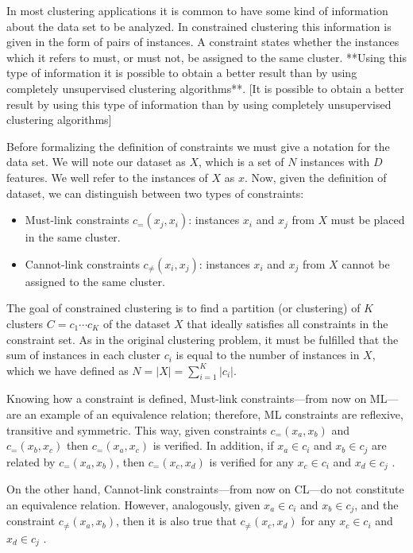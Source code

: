 \documentclass[review]{elsarticle}
\begin{document}
In most clustering applications it is common to have some kind of information about the data set to be analyzed. In constrained clustering this information is given in the form of pairs of instances. A constraint states whether the instances which it refers to must, or must not, be assigned to the same cluster. **Using this type of information it is possible to obtain a better result than by using completely unsupervised clustering algorithms**. [It is possible to obtain a better result by using this type of information than by using completely unsupervised clustering algorithms]

Before formalizing the definition of constraints we must give a notation for the data set. We will note our dataset as $X$, which is a set of $N$ instances with $D$ features. We well refer to the instances of $X$ as $x$. Now, given the definition of dataset, we can distinguish between two types of constraints:

\begin{itemize}

	\item Must-link constraints $c_=(x_j,x_i)$: instances $x_i$ and $x_j$ from $X$ must be placed in the same cluster.

	\item Cannot-link constraints $c_{\neq}(x_i,x_j)$: instances $x_i$ and $x_j$ from $X$ cannot be assigned to the same cluster.

\end{itemize}

The goal of constrained clustering is to find a partition (or clustering) of $K$ clusters $C = {c_1 \cdots c_K}$ of the dataset $X$ that ideally satisfies all constraints in the constraint set. As in the original clustering problem, it must be fulfilled that the sum of instances in each cluster $c_i$ is equal to the number of instances in $X$, which we have defined as $N = |X| = \sum_{i = 1}^{K} |c_i|$.

Knowing how a constraint is defined, Must-link constraints---from now on ML---are an example of an equivalence relation; therefore, ML constraints are reflexive, transitive and symmetric. This way, given constraints $c_=(x_a,x_b)$ and $c_=(x_b,x_c)$ then $c_=(x_a,x_c)$ is verified. In addition, if $x_a \in c_i$ and $x_b \in c_j$ are related by $c_=(x_a,x_b)$, then $c_=(x_c,x_d)$ is verified for any $x_c \in c_i$ and $x_d \in c_j$ \cite{xu2013improving}\cite{davidson2007survey}.

On the other hand, Cannot-link constraints---from now on CL---do not constitute an equivalence relation. However, analogously, given $x_a \in c_i$ and $x_b \in c_j$, and the constraint $c_{\neq}(x_a,x_b)$, then it is also true that $c_{\neq}(x_c,x_d)$ for any $x_c \in c_i$ and $x_d \in c_j$ \cite{davidson2007survey}.
\end{document}
